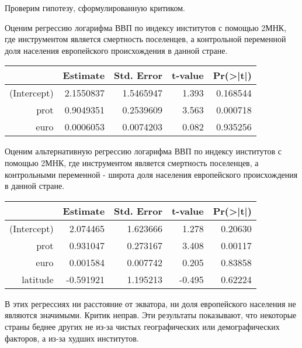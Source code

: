 \documentclass[a4paper,12pt]{article} %
\begin{document}
Проверим гипотезу, сформулированную критиком. 



Оценим регрессию логарифма ВВП по индексу институтов с помощью 2МНК, где инструментом является смертность  поселенцев, а контрольной переменной доля населения европейского происхождения в данной
стране.

\begin{table}[h!]
	\centering
	\begin{tabular}{rrrrr}
		\hline
		& Estimate & Std. Error & t-value & Pr(>|t|) \\ 
		\hline
		(Intercept) & 2.1550837 &  1.5465947 &  1.393& 0.168544    \\ 
		prot &  0.9049351 & 0.2539609 &  3.563& 0.000718 \\ 
		euro  &      0.0006053 & 0.0074203 &  0.082 &0.935256  
		 
		\\ 
		\hline
	\end{tabular}
\end{table}	



Оценим альтернативную регрессию логарифма ВВП по индексу институтов с помощью 2МНК, где инструментом является смертность  поселенцев, а контрольными переменной - широта доля населения европейского происхождения в данной
стране.



\begin{table}[h!]
	\centering
	\begin{tabular}{rrrrr}
		\hline
		& Estimate & Std. Error & t-value & Pr(>|t|) \\ 
		\hline
		(Intercept) &  2.074465  &  1.623666 &  1.278 & 0.20630  \\ 
		prot &  0.931047 &  0.273167 &  3.408 & 0.00117 \\ 
		euro      &   0.001584 &  0.007742  & 0.205 & 0.83858   \\ 
		latitude &  -0.591921  &  1.195213 & -0.495 &  0.62224       
		\\ 
		\hline
	\end{tabular}
\end{table}	


В этих регрессиях ни расстояние от экватора, ни доля европейского населения не являются значимыми. Критик неправ. Эти результаты показывают, что некоторые страны  беднее других не из-за чистых географических или демографических  факторов, а из-за худших институтов.


	
\end{document}
